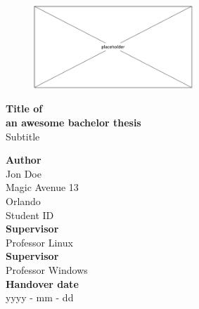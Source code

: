 
\begin{titlepage}
\thispagestyle{empty}

\begin{figure}[h]
\begin{flushright}
\includegraphics[trim= 0 0 0 0 , clip, width=6cm]{placeholder.png} 
\end{flushright}
\end{figure}
\vspace{0cm} 

\vspace{2cm}
\begin{center}
\Huge
\textbf{Title of } \\
\textbf{an awesome bachelor thesis}\\
\normalsize
\vspace{1cm}
Subtitle


\end{center}

\vspace{3cm}
\textbf{Author}\\
Jon Doe\\
Magic Avenue 13\\
Orlando\\
Student ID \\

\vspace{1cm}
\textbf{Supervisor}\\
Professor Linux \\

\vspace{1cm}
\textbf{Supervisor}\\
Professor Windows \\

\vspace{1cm}
\textbf{Handover date}\\
yyyy - mm - dd 

\end{titlepage}